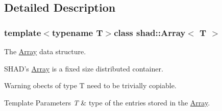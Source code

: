 \subsection{Detailed Description}
\subsubsection*{template$<$typename T$>$class shad\-::\-Array$<$ T $>$}

The \hyperlink{classshad_1_1Array}{Array} data structure. 

S\-H\-A\-D's \hyperlink{classshad_1_1Array}{Array} is a fixed size distributed container.

\begin{DoxyWarning}{Warning}
obects of type T need to be trivially copiable.
\end{DoxyWarning}

\begin{DoxyTemplParams}{Template Parameters}
{\em T} & type of the entries stored in the \hyperlink{classshad_1_1Array}{Array}. \\
\hline
\end{DoxyTemplParams}


